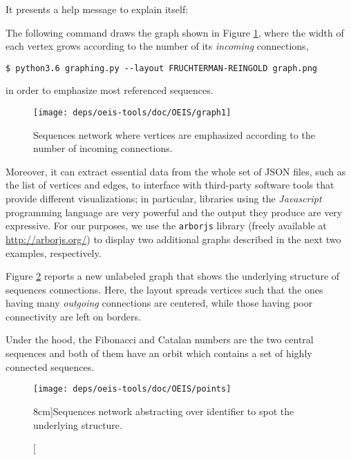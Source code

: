 It presents a help message to explain itself:

\begin{example}
The following command draws the graph shown in Figure
\ref{fig:oeis:sequences:network}, where the width of each vertex grows
according to the number of its \textit{incoming} connections,
\begin{Verbatim}[baselinestretch=0.8]
$ python3.6 graphing.py --layout FRUCHTERMAN-REINGOLD graph.png
\end{Verbatim}
in order to emphasize most referenced sequences.
\end{example}

\begin{figure}
\texttt{[image: deps/oeis-tools/doc/OEIS/graph1]}
\caption{Sequences network where vertices are emphasized according to the
number of incoming connections.}
\label{fig:oeis:sequences:network}
\end{figure}

Moreover, it can extract essential data from the whole set of JSON files, such
as the list of vertices and edges, to interface with third-party software tools
that provide different visualizations; in particular, libraries using the
\textit{Javascript} programming language are very powerful and the output they
produce are very expressive. For our purposes, we use the \verb|arborjs|
library (freely available at \url{http://arborjs.org/}) to display two
additional graphs described in the next two examples, respectively.

\begin{example}
Figure \ref{fig:oeis:sequences:network:fibonacci:catalan} reports a new
unlabeled graph that shows the underlying structure of sequences connections.
Here, the layout spreads vertices such that the ones having many
\textit{outgoing} connections are centered, while those having poor
connectivity are left on borders.

Under the hood, the Fibonacci and Catalan numbers are the two central sequences
and both of them have an orbit which contains a set of highly connected
sequences.
\end{example}

\begin{figure}
\texttt{[image: deps/oeis-tools/doc/OEIS/points]}
\caption[][8cm]{Sequences network abstracting over identifier to spot the underlying
structure.}
\label{fig:oeis:sequences:network:fibonacci:catalan}
\end{figure}

